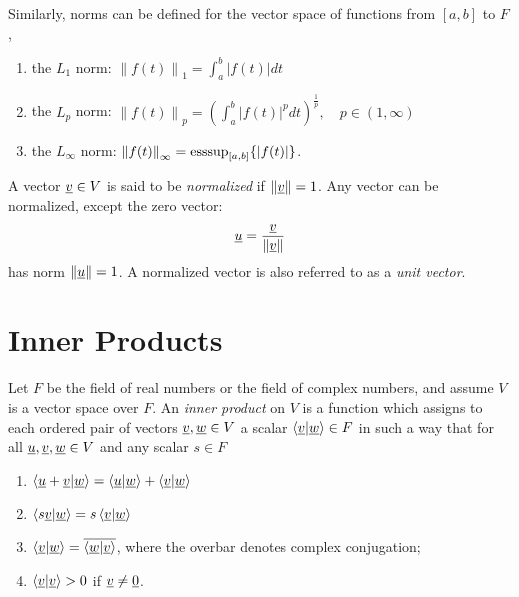 \begin{example}
Similarly, norms can be defined for the vector space of functions from $[a, b]$ to $F$,
\begin{enumerate}
\item the $L_1$ norm: $\left\| f(t) \right\|_1 = \int_a^b |f(t)| dt$
\item the $L_p$ norm: $\left\| f(t) \right\|_p = \left( \int_a^b |f(t)|^p dt \right)^{\frac{1}{p}}, \quad p \in (1,\infty)$
\item the $L_{\infty}$ norm: $\left\| f(t) \right\|_{\infty} = \operatorname{esssup}_{[a,b]} \{ | f(t) | \}$.
\end{enumerate}
\end{example}

\begin{definition}
A vector $\underline{v} \in V$ is said to be \emph{normalized} if $\left\| \underline{v} \right\| = 1$.
Any vector can be normalized, except the zero vector:
\begin{equation}
\underline{u} = \frac{\underline{v}}{\left\| \underline{v} \right\|}
\end{equation}
has norm $\left\| \underline{u} \right\| = 1$.
A normalized vector is also referred to as a \emph{unit vector}.
\end{definition}


\section{Inner Products}

\begin{definition} \label{definition:InnerProduct}
Let $F$ be the field of real numbers or the field of complex numbers, and assume $V$ is a vector space over $F$.
An \emph{inner product} on $V$ is a function which assigns to each ordered pair of vectors $\underline{v}, \underline{w} \in V$ a scalar $\left\langle \underline{v} | \underline{w} \right\rangle \in F$ in such a way that for all $\underline{u}, \underline{v}, \underline{w} \in V$ and any scalar $s \in F$
\begin{enumerate}
\item $\left\langle \underline{u} + \underline{v} | \underline{w} \right\rangle
= \left\langle \underline{u} | \underline{w} \right\rangle
+ \left\langle \underline{v} | \underline{w} \right\rangle$
\item $\left\langle s \underline{v} | \underline{w} \right\rangle
= s \left\langle \underline{v} | \underline{w} \right\rangle$
\item $\left\langle \underline{v} | \underline{w} \right\rangle
= \overline{ \left\langle \underline{w} | \underline{v} \right\rangle }$, where the overbar denotes complex conjugation;
\item $\left\langle \underline{v} | \underline{v} \right\rangle > 0$ if $\underline{v} \neq \underline{0}$.
\end{enumerate}
\end{definition}

